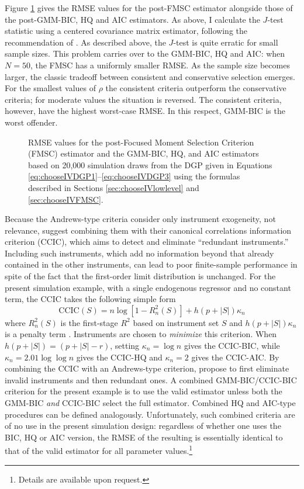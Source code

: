 Figure \ref{fig:chooseIVsim_RMSErelMSC} gives the RMSE values for the post-FMSC estimator alongside those of the post-GMM-BIC, HQ and AIC estimators.
As above, I calculate the $J$-test statistic using a centered covariance matrix estimator, following the recommendation of \cite{Andrews1999}.
As described above, the $J$-test is quite erratic for small sample sizes.
This problem carries over to the GMM-BIC, HQ and AIC: when $N = 50$, the FMSC has a uniformly smaller RMSE. 
As the sample size becomes larger, the classic tradeoff between consistent and conservative selection emerges.
For the smallest values of $\rho$ the consistent criteria outperform the conservative criteria; for moderate values the situation is reversed.
The consistent criteria, however, have the highest worst-case RMSE.
In this respect, GMM-BIC is the worst offender.
\begin{figure}
\centering
	
	\caption{RMSE values for the post-Focused Moment Selection Criterion (FMSC) estimator and the GMM-BIC, HQ, and AIC estimators based on 20,000 simulation draws from the DGP given in Equations \ref{eq:chooseIVDGP1}--\ref{eq:chooseIVDGP3} using the formulas described in Sections \ref{sec:chooseIVlowlevel} and \ref{sec:chooseIVFMSC}.}
	\label{fig:chooseIVsim_RMSErelMSC}
\end{figure}

Because the Andrews-type criteria consider only instrument exogeneity, not relevance, \cite{HallPeixe2003} suggest combining them with their canonical correlations information criterion (CCIC), which aims to detect and eliminate ``redundant instruments.''
Including such instruments, which add no information beyond that already contained in the other instruments, can lead to poor finite-sample performance in spite of the fact that the first-order limit distribution is unchanged.
For the present simulation example, with a single endogenous regressor and no constant term, the CCIC takes the following simple form
	\begin{equation}
	\mbox{CCIC}(S) = n \log\left[1 - R_n^2(S) \right] + h(p + |S|)\kappa_n
	\end{equation}
where $R_n^2(S)$ is the first-stage $R^2$ based on instrument set $S$ and $h(p + |S|)\kappa_n$ is a penalty term \citep{Jana2005}. 
Instruments are chosen to \emph{minimize} this criterion.
When $h(p + |S|) = (p + |S| - r)$, setting $\kappa_n = \log{n}$ gives the CCIC-BIC, while $\kappa_n = 2.01 \log{\log{n}}$ gives the CCIC-HQ and $\kappa_n = 2$ gives the CCIC-AIC.
By combining the CCIC with an Andrews-type criterion, \cite{HallPeixe2003} propose to first eliminate invalid instruments and then redundant ones.
A combined GMM-BIC/CCIC-BIC criterion for the present example is to use the valid estimator unless both the GMM-BIC \emph{and} CCIC-BIC select the full estimator.
Combined HQ and AIC-type procedures can be defined analogously.
Unfortunately, such combined criteria are of no use in the present simulation design: regardless of whether one uses the BIC, HQ or AIC version, the RMSE of the resulting is essentially identical to that of the valid estimator for all parameter values.\footnote{Details are available upon request.}